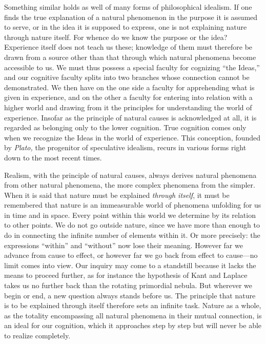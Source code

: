 \documentclass[12pt,a4paper]{article}
\newcommand{\opage}[1]{\marginnote{\footnotesize\textit{[#1]}}}
\begin{document}
Something similar holds as well of many forms of philosophical idealism.
If one finds the true explanation of a natural phenomenon in the purpose
it is assumed to serve, or in the idea it is supposed to express, one is
not explaining nature through nature itself. For whence do we know the
purpose or the idea? Experience itself does not teach us these; knowledge
of them must therefore be drawn from a source other than that through
which natural phenomena become accessible to us. We must thus possess a
special faculty for cognizing ``the Ideas,'' and our cognitive faculty
splits into two branches whose connection cannot be demonstrated. We then
have on the one side a faculty for apprehending what is given in
experience, and on the other a faculty for entering into relation with a
higher world and drawing from it the principles for understanding the
world of experience. Insofar as the principle of natural causes is
acknowledged at all, it is regarded as belonging only to the lower
cognition. True cognition comes only when we recognize the Ideas in the
world of experience. This conception, founded by \emph{Plato,} the \opage{4}progenitor of
speculative idealism, recurs in various forms right down to the most
recent times.

Realism, with the principle of natural causes, always derives natural
phenomena from other natural phenomena, the more complex phenomena from
the simpler. When it is said that nature must be explained \emph{through itself},
it must be remembered that nature is an immeasurable world of phenomena
unfolding for us in time and in space. Every point within this world we
determine by its relation to other points. We do not go outside nature,
since we have more than enough to do in connecting the infinite number of
elements within it. Or more precisely: the expressions ``within'' and
``without'' now lose their meaning. However far we advance from cause to
effect, or however far we go back from effect to cause---no limit comes
into view. Our inquiry may come to a standstill because it lacks the
means to proceed further, as for instance the hypothesis of Kant and
Laplace takes us no further back than the rotating primordial nebula. But
wherever we begin or end, a new question always stands before us. The
principle that nature is to be explained through itself therefore sets an
infinite task. Nature as a whole, as the totality encompassing all natural
phenomena in their mutual connection, is an ideal for our cognition, which
it approaches step by step but will never be able to realize completely.
\end{document}
